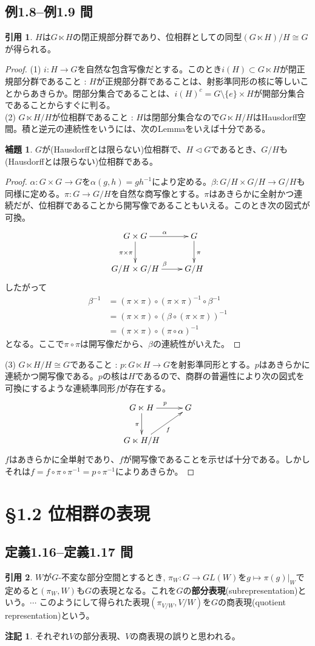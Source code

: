 \documentclass[12pt]{jsarticle}
\theoremstyle{definition}%
\newtheorem*{lemma}{補題}
\newtheorem*{note}{注記}
\newtheorem*{quo}{引用}%
\renewenvironment{leftbar}{%
  \renewcommand\FrameCommand{\vrule width 1pt \hspace{10pt}}%
  \MakeFramed {\advance\hsize-\width \FrameRestore}}%
 {\endMakeFramed}
\newcommand{\barquo}[1]{\begin{leftbar} \begin{quo}  #1 \end{quo} \end{leftbar}}
\newcommand{\bfsubsection}[1]{\subsection*{\textbf{#1}}}
\begin{document}
\bfsubsection{例1.8--例1.9 間}
\barquo{
$H$は$G \ltimes H$の閉正規部分群であり、位相群としての同型$(G \ltimes H)/ H \cong G$が得られる。
}
\begin{proof}
  (1) $i \colon H \to G$を自然な包含写像だとする。このとき$i(H) \subset G \ltimes H$が閉正規部分群であること : $H$が正規部分群であることは、射影準同形の核に等しいことからあきらか。閉部分集合であることは、$i(H)^c = G\setminus \{ e \} \times H$が開部分集合であることからすぐに判る。\\
  (2) $G \ltimes H/H$が位相群であること : $H$は閉部分集合なので$G \ltimes H/H$はHausdorff空間。積と逆元の連続性をいうには、次のLemmaをいえば十分である。
  \begin{lemma}
    $G$が(Hausdorffとは限らない)位相群で、$H \lhd G$であるとき、$G/H$も(Hausdorffとは限らない)位相群である。
  \end{lemma}
\begin{proof}
$\alpha \colon G \times G \to G$を$\alpha(g,h)=gh^{-1}$により定める。$\beta \colon G/H \times G/H \to G/H$も同様に定める。$\pi \colon G \to G/H$を自然な商写像とする。$\pi$はあきらかに全射かつ連続だが、位相群であることから開写像であることもいえる。このとき次の図式が可換。
\[
\xymatrix{
G \times G \ar[r]^{\alpha} \ar[d]_{\pi \times \pi} & G \ar[d]^{\pi} \\
G/H \times G/H \ar[r]^{\beta} & G/H
}
\]
したがって
\begin{align*}
\beta^{-1} &= (\pi \times \pi) \circ (\pi \times \pi)^{-1}\circ \beta^{-1} \\
&= (\pi \times \pi) \circ ( \beta \circ (\pi \times \pi))^{-1} \\
&= (\pi \times \pi) \circ (\pi \circ \alpha)^{-1}
\end{align*}
となる。ここで$\pi \circ \pi$は開写像だから、$\beta$の連続性がいえた。
\end{proof}
(3) $G \ltimes H /H \cong G$であること : $p \colon G \ltimes H \to G$を射影準同形とする。$p$はあきらかに連続かつ開写像である。$p$の核は$H$であるので、商群の普遍性により次の図式を可換にするような連続準同形$f$が存在する。
\[
\xymatrix{
G \ltimes H \ar[r]^p \ar[d]_{\pi} & G \\
G \ltimes H / H \ar[ur]_f
}
\]
$f$はあきらかに全単射であり、$f$が開写像であることを示せば十分である。しかしそれは$f = f \circ \pi \circ \pi^{-1} = p \circ \pi^{-1}$によりあきらか。
\end{proof}



\section*{\S 1.2 位相群の表現}
\bfsubsection{定義1.16--定義1.17 間}
\barquo{
$W$が$G$-不変な部分空間とするとき, $\pi_W \colon G \to GL(W)$を$g \mapsto \pi(g)|_W$で定めると$(\pi_W, W)$も$G$の表現となる。これを$G$の\textbf{部分表現}(subrepresentation)という。$\cdots$ このようにして得られた表現$(\pi_{V/W},V/W)$を$G$の$\textbf{商表現}$(quotient representation)という。
}
\begin{note}
  それぞれ$V$の部分表現、$V$の商表現の誤りと思われる。
\end{note}
\end{document}
